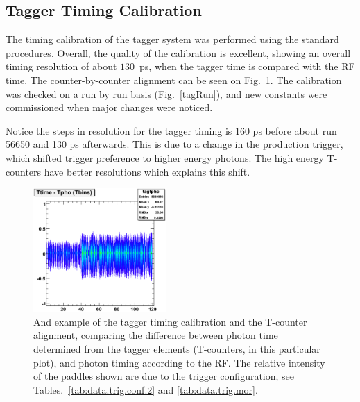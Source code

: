 \subsection{\label{sec:calib.tag}Tagger Timing Calibration}
The timing calibration of the tagger system was performed using the standard procedures. Overall, the quality of the calibration is excellent, showing an overall timing resolution of about $130$~ps, when the tagger time is compared with the RF time. The counter-by-counter alignment can be seen on Fig.~\ref{tagtpho}. The calibration was checked on a run by run basis (Fig.~\ref{tagRun}), and new constants were commissioned when major changes were noticed.

\begin{v2}
Notice the steps in resolution for the tagger timing is 160 ps before about run 56650 and 130 ps afterwards. This is due to a change in the production trigger, which shifted trigger preference to higher energy photons. The high energy T-counters have better resolutions which explains this shift.
\end{v2}

\begin{figure}[htpb]
\begin{center}
 \includegraphics[width=0.45\textwidth]{figures/calib/tag/timing/tagtpho.eps}
  \caption{And example of the tagger timing calibration and the T-counter alignment, comparing  the difference between photon time determined from the tagger elements (T-counters, in this particular plot), and photon timing according to the RF. The relative intensity of the paddles shown are due to the trigger configuration, see Tables.~\ref{tab:data.trig.conf.2} and \ref{tab:data.trig.mor}.}
  \label{tagtpho}
  \end{center}
\end{figure}


